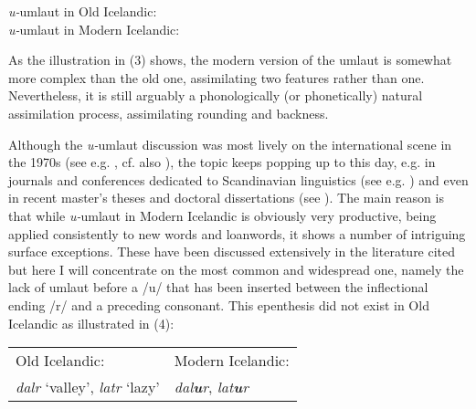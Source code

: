 \documentclass[output=paper,
modfonts
]{LSP/langsci}
\begin{document}
\ea
	\ea \emph{u-}umlaut in Old Icelandic:\\
	\ex \emph{u-}umlaut in Modern Icelandic:\\
	\z
\z

\noindent As the illustration in (3) shows, the modern version of the umlaut is
somewhat more complex than the old one, assimilating two features rather
than one. Nevertheless, it is still arguably a phonologically (or
phonetically) natural assimilation process, assimilating rounding and
backness.

Although the \emph{u-}umlaut discussion was most lively on the
international scene in the 1970s (see e.g. \citealt{iverson1978t,iverson1976,oresnik1975,oresnik1977}, cf. also \citealt{valfells1967}), the topic
keeps popping up to this day, e.g. in journals and conferences dedicated
to Scandinavian linguistics (see e.g. \citealt{gibson2000,indridason2010,thrainsson2011,hansson2013}) and even in recent master's theses
and doctoral dissertations (see \citealt{markusson2012,ingason2016}). The main
reason is that while \emph{u-}umlaut in Modern Icelandic is obviously
very productive, being applied consistently to new words and loanwords,
it shows a number of intriguing surface exceptions. These have been
discussed extensively in the literature cited but here I will
concentrate on the most common and widespread one, namely the lack of
umlaut before a /u/ that has been inserted between the inflectional
ending /r/ and a preceding consonant. This epenthesis did not exist in
Old Icelandic as illustrated in (4):

\ea
\begin{tabular}[t]{ l l }
Old Icelandic: & Modern Icelandic: \\
\emph{dalr} `valley', \emph{latr} `lazy'  & \emph{dal\textbf{u}r}, \emph{lat\textbf{u}r}
\end{tabular}
\z
\end{document}
